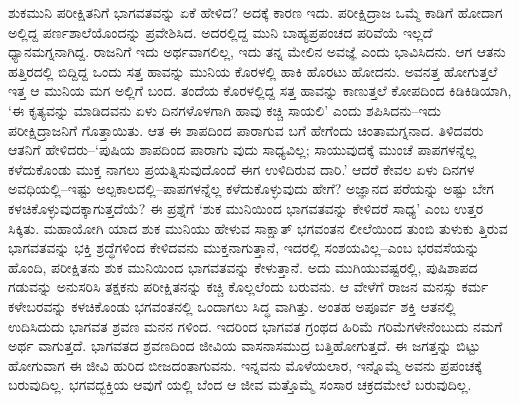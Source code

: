 ಶುಕಮುನಿ ಪರೀಕ್ಷಿತನಿಗೆ ಭಾಗವತವನ್ನು ಏಕೆ ಹೇಳಿದ? ಅದಕ್ಕೆ ಕಾರಣ ಇದು. ಪರೀಕ್ಷಿದ್ರಾಜ ಒಮ್ಮೆ ಕಾಡಿಗೆ ಹೋದಾಗ ಅಲ್ಲಿದ್ದ ಪರ್ಣಶಾಲೆಯೊಂದನ್ನು ಪ್ರವೇಶಿಸಿದ. ಅದರಲ್ಲಿದ್ದ ಮುನಿ ಬಾಹ್ಯಪ್ರಪಂಚದ ಪರಿವೆಯೆ ಇಲ್ಲದೆ ಧ್ಯಾನಮಗ್ನನಾಗಿದ್ದ. ರಾಜನಿಗೆ ಇದು ಅರ್ಥವಾಗಲಿಲ್ಲ, ಇದು ತನ್ನ ಮೇಲಿನ ಅವಜ್ಞೆ ಎಂದು ಭಾವಿಸಿದನು. ಆಗ ಆತನು ಹತ್ತಿರದಲ್ಲಿ ಬಿದ್ದಿದ್ದ ಒಂದು ಸತ್ತ ಹಾವನ್ನು ಮುನಿಯ ಕೊರಳಲ್ಲಿ ಹಾಕಿ ಹೊರಟು ಹೋದನು. ಅವನತ್ತ ಹೋಗುತ್ತಲೆ ಇತ್ತ ಆ ಮುನಿಯ ಮಗ ಅಲ್ಲಿಗೆ ಬಂದ. ತಂದೆಯ ಕೊರಳಲ್ಲಿದ್ದ ಸತ್ತ ಹಾವನ್ನು ಕಾಣುತ್ತಲೆ ಕೋಪದಿಂದ ಕಿಡಿಕಿಡಿಯಾಗಿ, ‘ಈ ಕೃತ್ಯವನ್ನು ಮಾಡಿದವನು ಏಳು ದಿನಗಳೊಳಗಾಗಿ ಹಾವು ಕಚ್ಚಿ ಸಾಯಲಿ’ ಎಂದು ಶಪಿಸಿದನು–ಇದು ಪರೀಕ್ಷಿದ್ರಾಜನಿಗೆ ಗೊತ್ತಾಯಿತು. ಆತ ಈ ಶಾಪದಿಂದ ಪಾರಾಗುವ ಬಗೆ ಹೇಗೆಂದು ಚಿಂತಾಮಗ್ನನಾದ. ತಿಳಿದವರು ಆತನಿಗೆ ಹೇಳಿದರು–‘ಪುಷಿಯ ಶಾಪದಿಂದ ಪಾರಾಗು ವುದು ಸಾಧ್ಯವಿಲ್ಲ; ಸಾಯುವುದಕ್ಕೆ ಮುಂಚೆ ಪಾಪಗಳನ್ನೆಲ್ಲ ಕಳೆದುಕೊಂಡು ಮುಕ್ತ ನಾಗಲು ಪ್ರಯತ್ನಿಸುವುದೊಂದೆ ಈಗ ಉಳಿದಿರುವ ದಾರಿ.’ ಆದರೆ ಕೇವಲ ಏಳು ದಿನಗಳ ಅವಧಿಯಲ್ಲಿ–ಇಷ್ಟು ಅಲ್ಪಕಾಲದಲ್ಲಿ–ಪಾಪಗಳನ್ನೆಲ್ಲ ಕಳೆದುಕೊಳ್ಳುವುದು ಹೇಗೆ? ಅಜ್ಞಾನದ ಪರೆಯನ್ನು ಅಷ್ಟು ಬೇಗ ಕಳಚಿಕೊಳ್ಳುವುದಕ್ಕಾಗುತ್ತದೆಯೆ? ಈ ಪ್ರಶ್ನೆಗೆ ‘ಶುಕ ಮುನಿಯಿಂದ ಭಾಗವತವನ್ನು ಕೇಳಿದರೆ ಸಾಧ್ಯ’ ಎಂಬ ಉತ್ತರ ಸಿಕ್ಕಿತು. ಮಹಾಯೋಗಿ ಯಾದ ಶುಕ ಮುನಿಯು ಹೇಳುವ ಸಾಕ್ಷಾತ್ ಭಗವಂತನ ಲೀಲೆಯಿಂದ ತುಂಬಿ ತುಳುಕು ತ್ತಿರುವ ಭಾಗವತವನ್ನು ಭಕ್ತಿ ಶ್ರದ್ಧೆಗಳಿಂದ ಕೇಳಿದವನು ಮುಕ್ತನಾಗುತ್ತಾನೆ, ಇದರಲ್ಲಿ ಸಂಶಯವಿಲ್ಲ–ಎಂಬ ಭರವಸೆಯನ್ನು ಹೊಂದಿ, ಪರೀಕ್ಷಿತನು ಶುಕ ಮುನಿಯಿಂದ ಭಾಗವತವನ್ನು ಕೇಳುತ್ತಾನೆ. ಅದು ಮುಗಿಯುವಷ್ಟರಲ್ಲಿ, ಪುಷಿಶಾಪದ ಗಡುವನ್ನು ಅನುಸರಿಸಿ ತಕ್ಷಕನು ಪರೀಕ್ಷಿತನನ್ನು ಕಚ್ಚಿ ಕೊಲ್ಲಲೆಂದು ಬರುವನು. ಆ ವೇಳೆಗೆ ರಾಜನ ಮನಸ್ಸು ಕರ್ಮ ಕಳೇಬರವನ್ನು ಕಳಚಿಕೊಂಡು ಭಗವಂತನಲ್ಲಿ ಒಂದಾಗಲು ಸಿದ್ಧ ವಾಗಿತ್ತು. ಅಂತಹ ಅಪೂರ್ವ ಶಕ್ತಿ ಆತನಲ್ಲಿ ಉದಿಸಿದುದು ಭಾಗವತ ಶ್ರವಣ ಮನನ ಗಳಿಂದ. ಇದರಿಂದ ಭಾಗವತ ಗ್ರಂಥದ ಹಿರಿಮೆ ಗರಿಮೆಗಳೇನೆಂಬುದು ನಮಗೆ ಅರ್ಥ ವಾಗುತ್ತದೆ. ಭಾಗವತದ ಶ್ರವಣದಿಂದ ಜೀವಿಯ ವಾಸನಾಸಮುದ್ರ ಬತ್ತಿಹೋಗುತ್ತದೆ. ಈ ಜಗತ್ತನ್ನು ಬಿಟ್ಟು ಹೋಗುವಾಗ ಈ ಜೀವಿ ಹುರಿದ ಬೀಜದಂತಾಗುವನು. ಇನ್ನವನು ಮೊಳೆಯಲಾರ, ಇನ್ನೊಮ್ಮೆ ಅವನು ಪ್ರಪಂಚಕ್ಕೆ ಬರುವುದಿಲ್ಲ. ಭಗವದ್ಭಕ್ತಿಯ ಆವುಗೆ ಯಲ್ಲಿ ಬೆಂದ ಆ ಜೀವ ಮತ್ತೊಮ್ಮೆ ಸಂಸಾರ ಚಕ್ರದಮೇಲೆ ಬರುವುದಿಲ್ಲ.

